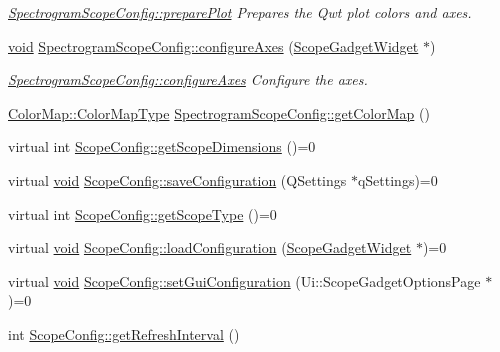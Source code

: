 \begin{DoxyCompactItemize}
\begin{DoxyCompactList}\small\item\em \hyperlink{group___scope_plugin_ga56b200887661925df25743af2f62375b}{\-Spectrogram\-Scope\-Config\-::prepare\-Plot} \-Prepares the \-Qwt plot colors and axes. \end{DoxyCompactList}\item 
\hyperlink{group___u_a_v_objects_plugin_ga444cf2ff3f0ecbe028adce838d373f5c}{void} \hyperlink{group___scope_plugin_ga607c43753c7a8540b7953d4945f2f6b5}{\-Spectrogram\-Scope\-Config\-::configure\-Axes} (\hyperlink{class_scope_gadget_widget}{\-Scope\-Gadget\-Widget} $\ast$)
\begin{DoxyCompactList}\small\item\em \hyperlink{group___scope_plugin_ga607c43753c7a8540b7953d4945f2f6b5}{\-Spectrogram\-Scope\-Config\-::configure\-Axes} \-Configure the axes. \end{DoxyCompactList}\item 
\hyperlink{group___scope_plugin_ga7f4f087196557757ec8061242e795031}{\-Color\-Map\-::\-Color\-Map\-Type} \hyperlink{group___scope_plugin_ga429eb179a2c1b1f46a1d45a699e983f2}{\-Spectrogram\-Scope\-Config\-::get\-Color\-Map} ()
\item 
virtual int \hyperlink{group___scope_plugin_ga4eaff3a14398928e3ffba453ea199699}{\-Scope\-Config\-::get\-Scope\-Dimensions} ()=0
\item 
virtual \hyperlink{group___u_a_v_objects_plugin_ga444cf2ff3f0ecbe028adce838d373f5c}{void} \hyperlink{group___scope_plugin_gac41e7079a53acbf5fc4c32b59c120da2}{\-Scope\-Config\-::save\-Configuration} (\-Q\-Settings $\ast$q\-Settings)=0
\item 
virtual int \hyperlink{group___scope_plugin_gafdf4c997ec7b0c40644711b3578db610}{\-Scope\-Config\-::get\-Scope\-Type} ()=0
\item 
virtual \hyperlink{group___u_a_v_objects_plugin_ga444cf2ff3f0ecbe028adce838d373f5c}{void} \hyperlink{group___scope_plugin_gaea33bfb89c03afcf1f81969983ed926c}{\-Scope\-Config\-::load\-Configuration} (\hyperlink{class_scope_gadget_widget}{\-Scope\-Gadget\-Widget} $\ast$)=0
\item 
virtual \hyperlink{group___u_a_v_objects_plugin_ga444cf2ff3f0ecbe028adce838d373f5c}{void} \hyperlink{group___scope_plugin_ga322c46b28e707e71d7076f0e51cdc0b4}{\-Scope\-Config\-::set\-Gui\-Configuration} (\-Ui\-::\-Scope\-Gadget\-Options\-Page $\ast$)=0
\item 
int \hyperlink{group___scope_plugin_ga6886a1b5239454cd6525352914381382}{\-Scope\-Config\-::get\-Refresh\-Interval} ()

\end{DoxyCompactItemize}

